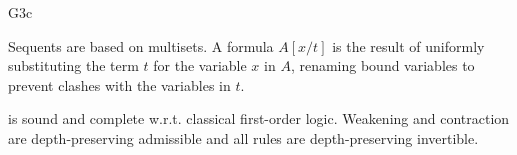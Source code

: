 \begin{entry}{G3c}
\begin{clarifications}
  Sequents are based on multisets. A formula $A[x/t]$ is the result of
  uniformly substituting the term $t$ for the variable $x$ in
  $A$, renaming bound variables to prevent clashes with the variables in $t$.\nocite{Troelstra:2000}
\end{clarifications}


\begin{technicalities}
  \Gtc is sound and complete w.r.t. classical first-order logic. 
  Weakening and contraction are depth-preserving admissible and 
  all rules are depth-preserving invertible.
\end{technicalities}


\end{entry}

